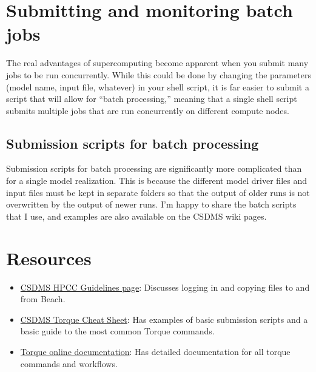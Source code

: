 \documentclass[12pt, oneside]{article}   	%
\begin{document}
\section{Submitting and monitoring batch jobs}
The real advantages of supercomputing become apparent when you submit many jobs to be run concurrently. While this could be done by changing the parameters (model name, input file, whatever) in your shell script, it is far easier to submit a script that will allow for ``batch processing,'' meaning that a single shell script submits multiple jobs that are run concurrently on different compute nodes.
\subsection{Submission scripts for batch processing}
Submission scripts for batch processing are significantly more complicated than for a single model realization. This is because the different model driver files and input files must be kept in separate folders so that the output of older runs is not overwritten by the output of newer runs. I'm happy to share the batch scripts that I use, and examples are also available on the CSDMS wiki pages. 
\section{Resources}
\begin{itemize}
\item \href{https://csdms.colorado.edu/wiki/HPCC_guidelines}{CSDMS HPCC Guidelines page}: Discusses logging in and copying files to and from Beach.
\item \href{https://csdms.colorado.edu/wiki/HPCC_usage_rules}{CSDMS Torque Cheat Sheet}: Has examples of basic submission scripts and a basic guide to the most common Torque commands.
\item \href{http://docs.adaptivecomputing.com/torque/4-0-2/help.htm}{Torque online documentation}: Has detailed documentation for all torque commands and workflows.
\end{itemize}
\end{document}
